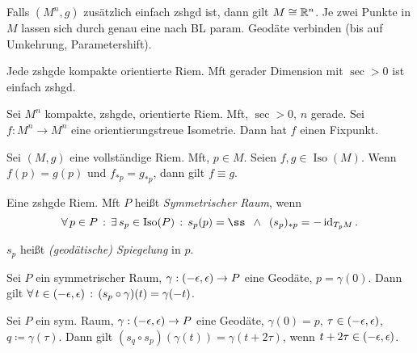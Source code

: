 \documentclass{cheat-sheet}
\newcommand{\vinterval}{\ointerval{-\epsilon}{\epsilon}} %
\DeclareMathOperator{\Iso}{Iso} %
\begin{document}

\begin{kor}
  Falls $(M^n, g)$ zusätzlich einfach zshgd ist, dann gilt $M \cong \mathbb{R}^n$.
  Je zwei Punkte in $M$ lassen sich durch genau eine nach BL param. Geodäte verbinden (bis auf Umkehrung, Parametershift).
\end{kor}


\begin{satz}
  Jede zshgde kompakte orientierte Riem. Mft gerader Dimension mit $\sec > 0$ ist einfach zshgd.
\end{satz}

\begin{satz}
  Sei $M^n$ kompakte, zshgde, orientierte Riem. Mft, $\sec > 0$, $n$ gerade. Sei $f : M^n \to M^n$ eine orientierungstreue Isometrie. Dann hat $f$ einen Fixpunkt.
\end{satz}



\begin{prop}
  Sei $(M, g)$ eine vollständige Riem. Mft, $p \in M$. Seien $f, g \in \Iso(M)$. Wenn $f(p) = g(p)$ und $f_{*p} = g_{*p}$, dann gilt $f \equiv g$.
\end{prop}

\begin{defn}
  Eine zshgde Riem. Mft $P$ heißt \emph{Symmetrischer Raum}, wenn
  \[
    \fa{p \in P} \ex{s_p \in \Iso(P)}
    s_p(p) = ß \enspace \wedge \enspace (s_p)_{*p} = - \id_{T_p M}.
  \]
\end{defn}

\begin{sprech}
  $s_p$ heißt \emph{(geodätische) Spiegelung} in $p$.
\end{sprech}

\begin{lem}
  Sei $P$ ein symmetrischer Raum, $\gamma : \vinterval \to P$ eine Geodäte, $p = \gamma(0)$. Dann gilt
  $\fa{t \in \vinterval} (s_p \circ \gamma)(t) = \gamma(-t)$.
\end{lem}

\begin{lem}
  Sei $P$ ein sym. Raum, $\gamma : \vinterval \to P$ eine Geodäte, $\gamma(0) = p$, $\tau \in \vinterval$, $q \coloneqq \gamma(\tau)$. Dann gilt $(s_q \circ s_p)(\gamma(t)) = \gamma(t + 2 \tau)$, wenn $t + 2 \tau \in \vinterval$.
\end{lem}
\end{document}
